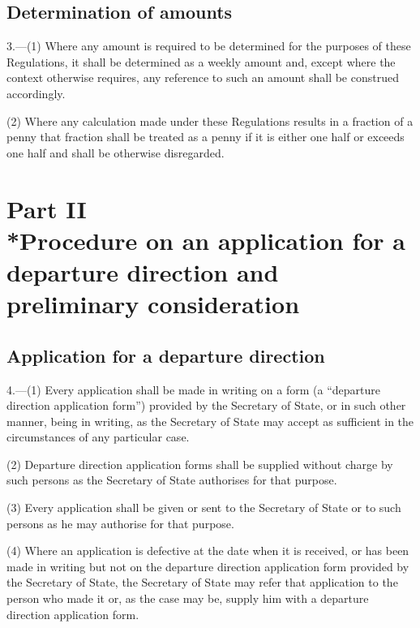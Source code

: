 \documentclass[12pt,a4paper]{article}
\begin{document}
\subsection[3. Determination of amounts]{Determination of amounts}

3.—(1) Where any amount is required to be determined for
the purposes of these Regulations, it shall be determined as a weekly amount
and, except where the context otherwise requires, any reference to such an
amount shall be construed accordingly.

(2) Where any calculation made under these Regulations results in a fraction of
a penny that fraction shall be treated as a penny if it is either one half or
exceeds one half and shall be otherwise disregarded.

\section[Part II --- Procedure on an application for a departure direction and preliminary consideration]{Part II\\*Procedure on an application for a departure direction and preliminary consideration}

\renewcommand\parthead{--- Part II}

\subsection[4. Application for a departure direction]{Application for a departure direction}

4.—(1) Every application shall
be made in writing on a form (a “departure direction application form”) provided
by the Secretary of State, or in such other manner, being in writing, as the
Secretary of State may accept as sufficient in the circumstances of any
particular case.

(2) Departure direction application forms shall be supplied without charge by
such persons as the Secretary of State authorises for that purpose.

(3) Every application shall be given or sent to the Secretary of State or to
such persons as he may authorise for that purpose.

(4) Where an application is defective at the date when it is received, or has
been made in writing but not on the departure direction application form
provided by the Secretary of State, the Secretary of State may refer that
application to the person who made it or, as the case may be, supply him with a
departure direction application form.
\end{document}
